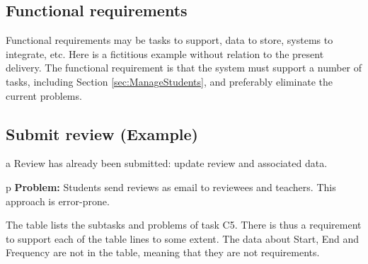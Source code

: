 \documentclass[Main]{subfiles}
\begin{document}
\subsection{Functional requirements}

Functional requirements may be tasks to support, data to store, systems to integrate, etc. 
Here is a fictitious example without relation to the present delivery. 
The functional requirement is that the system must support a number of tasks, including Section \ref{sec:ManageStudents}, and preferably eliminate the current problems.

\subsection{Submit review (Example)} 

\begin{DataIntro}
\end{DataIntro}

\begin{TaskTable}

\RecordAddi
{a}
{Review has already been submitted: update review and associated data.}{}


\RecordAddi
{p}
{\textbf{Problem:} Students send reviews as email to reviewees and teachers. This approach is error-prone.}{}{}
\end{TaskTable}

The table lists the subtasks and problems of task C5. 
There is thus a requirement to support each of the table lines to some extent. 
The data about Start, End and Frequency are not in the table, meaning that they are not requirements.
\end{document}
